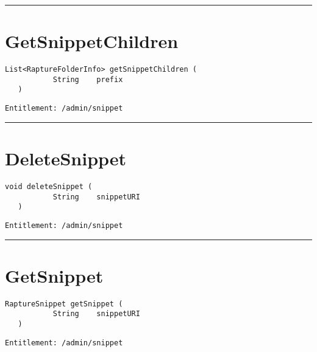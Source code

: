 \rule{12cm}{2pt}
\section{GetSnippetChildren}
\label{Api:GetSnippetChildren}
\begin{lstlisting}[style=nonumbers]
   List<RaptureFolderInfo> getSnippetChildren (
           String    prefix
   )
\end{lstlisting}
\begin{Verbatim}[formatcom=\color{Maroon}]
  Entitlement: /admin/snippet
\end{Verbatim}



\rule{12cm}{2pt}
\section{DeleteSnippet}
\label{Api:DeleteSnippet}
\begin{lstlisting}[style=nonumbers]
   void deleteSnippet (
           String    snippetURI
   )
\end{lstlisting}
\begin{Verbatim}[formatcom=\color{Maroon}]
  Entitlement: /admin/snippet
\end{Verbatim}



\rule{12cm}{2pt}
\section{GetSnippet}
\label{Api:GetSnippet}
\begin{lstlisting}[style=nonumbers]
   RaptureSnippet getSnippet (
           String    snippetURI
   )
\end{lstlisting}
\begin{Verbatim}[formatcom=\color{Maroon}]
  Entitlement: /admin/snippet
\end{Verbatim}



